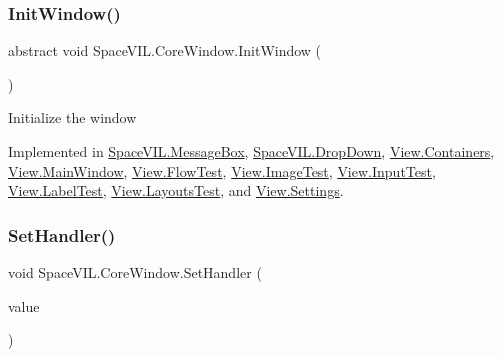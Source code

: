 \subsubsection{\texorpdfstring{Init\+Window()}{InitWindow()}}
{\footnotesize\ttfamily abstract void Space\+V\+I\+L.\+Core\+Window.\+Init\+Window (\begin{DoxyParamCaption}{ }\end{DoxyParamCaption})\hspace{0.3cm}{\ttfamily [pure virtual]}}



Initialize the window 



Implemented in \mbox{\hyperlink{class_space_v_i_l_1_1_message_box_ac14ecd2643e043c578ef4cf568887daf}{Space\+V\+I\+L.\+Message\+Box}}, \mbox{\hyperlink{class_space_v_i_l_1_1_drop_down_a291f706e5ec6558798d20fa428b2ba91}{Space\+V\+I\+L.\+Drop\+Down}}, \mbox{\hyperlink{class_view_1_1_containers_a78f0f1f1a35caf1cc7a1f4a9a9d159a2}{View.\+Containers}}, \mbox{\hyperlink{class_view_1_1_main_window_a1c3022ebb735b59e12ba1e9bc5cf3a90}{View.\+Main\+Window}}, \mbox{\hyperlink{class_view_1_1_flow_test_abf842c8c39e43a9d0e4b160b04084f90}{View.\+Flow\+Test}}, \mbox{\hyperlink{class_view_1_1_image_test_aa7b380fa57f08a6628ca45aec3d2254e}{View.\+Image\+Test}}, \mbox{\hyperlink{class_view_1_1_input_test_a9887db9b33135e82710ac4c02ffcec52}{View.\+Input\+Test}}, \mbox{\hyperlink{class_view_1_1_label_test_afc1aadc0634c9a71494e371204bfdf08}{View.\+Label\+Test}}, \mbox{\hyperlink{class_view_1_1_layouts_test_a6e89f1beff3ea667915a0987203df404}{View.\+Layouts\+Test}}, and \mbox{\hyperlink{class_view_1_1_settings_a14740ebfdf1f004feb4b7248bf3e567a}{View.\+Settings}}.

\mbox{\label{class_space_v_i_l_1_1_core_window_a24e6d614aac5f7e1c8274edf92c214c5}} 
\subsubsection{\texorpdfstring{Set\+Handler()}{SetHandler()}}
{\footnotesize\ttfamily void Space\+V\+I\+L.\+Core\+Window.\+Set\+Handler (\begin{DoxyParamCaption}\item[{\mbox{\hyperlink{class_space_v_i_l_1_1_window_layout}{Window\+Layout}}}]{value }\end{DoxyParamCaption})\hspace{0.3cm}{\ttfamily [inline]}}




